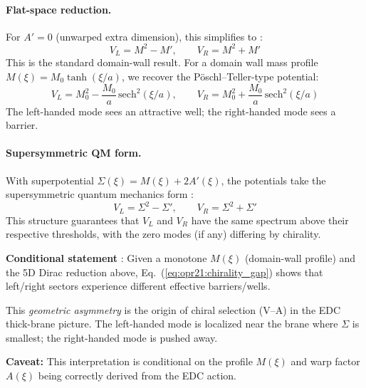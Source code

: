 \paragraph{Flat-space reduction.}
For $A' = 0$ (unwarped extra dimension), this simplifies to \tagM{}:
\begin{equation}
    V_L = M^2 - M', \qquad V_R = M^2 + M'
    \label{eq:opr21:flat_potentials}
\end{equation}
This is the standard domain-wall result. For a domain wall mass profile
$M(\xi) = M_0 \tanh(\xi/a)$, we recover the P\"oschl--Teller-type potential:
\begin{equation}
    V_L = M_0^2 - \frac{M_0}{a}\,\text{sech}^2(\xi/a), \qquad
    V_R = M_0^2 + \frac{M_0}{a}\,\text{sech}^2(\xi/a)
\end{equation}
The left-handed mode sees an attractive well; the right-handed mode sees a barrier.

\paragraph{Supersymmetric QM form.}
With superpotential $\Sigma(\xi) = M(\xi) + 2A'(\xi)$, the potentials take the
supersymmetric quantum mechanics form \tagM{}:
\begin{equation}
    V_L = \Sigma^2 - \Sigma', \qquad V_R = \Sigma^2 + \Sigma'
\end{equation}
This structure guarantees that $V_L$ and $V_R$ have the same spectrum above
their respective thresholds, with the zero modes (if any) differing by chirality.

\begin{tcolorbox}[colback=green!5!white, colframe=green!50!black,
    title=\textbf{Interpretation: Geometric Origin of V--A}]
\label{box:opr21_va_origin}

\textbf{Conditional statement} \tagDc{}:
Given a monotone $M(\xi)$ (domain-wall profile) and the 5D Dirac reduction above,
Eq.~(\ref{eq:opr21:chirality_gap}) shows that left/right sectors experience
different effective barriers/wells.

This \emph{geometric asymmetry} is the origin of chiral selection (V--A) in the
EDC thick-brane picture. The left-handed mode is localized near the brane where
$\Sigma$ is smallest; the right-handed mode is pushed away.

\textbf{Caveat:} This interpretation is conditional on the profile $M(\xi)$ and
warp factor $A(\xi)$ being correctly derived from the EDC action.
\end{tcolorbox}

